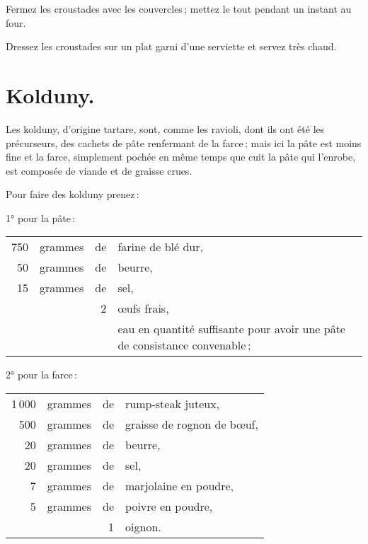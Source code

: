 Fermez les croustades avec les couvercles ; mettez le tout pendant un instant
au four.

Dressez les croustades sur un plat garni d'une serviette et servez très chaud.

\section*{\centering Kolduny.}
{}

Les kolduny, d'origine tartare, sont, comme les ravioli, dont ils ont été les
précurseurs, des cachets de pâte renfermant de la farce ; mais ici la pâte est
moins fine et la farce, simplement pochée en même temps que cuit la pâte qui
l'enrobe, est composée de viande et de graisse crues.

\medskip

Pour faire des kolduny prenez :

\medskip

1° pour la pâte :

\footnotesize
\begin{longtable}{rrrp{16em}}
    750 & grammes & de & farine de blé dur,                                                               \\
     50 & grammes & de & beurre,                                                                          \\
     15 & grammes & de & sel,                                                                             \\
        &         &  2 & œufs frais,                                                                      \\
        &         &    & eau en quantité suffisante pour avoir une pâte de consistance convenable ;       \\
\end{longtable}
\normalsize

2° pour la farce :

\footnotesize
\begin{longtable}{rrrp{16em}}
  1 000 & grammes & de & rump-steak juteux,                                                               \\
    500 & grammes & de & graisse de rognon de bœuf,                                                       \\
     20 & grammes & de & beurre,                                                                          \\
     20 & grammes & de & sel,                                                                             \\
      7 & grammes & de & marjolaine en poudre,                                                            \\
      5 & grammes & de & poivre en poudre,                                                                \\
        &         &  1 & oignon.                                                                          \\
\end{longtable}
\normalsize

